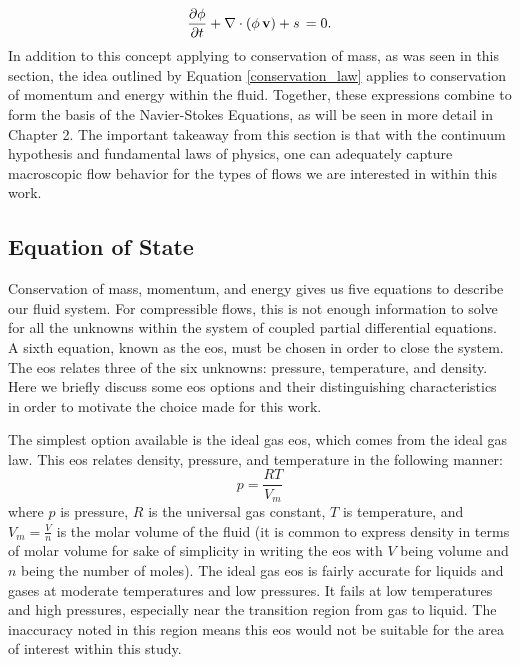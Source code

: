 \begin{equation} \label{conservation_law}
\dfrac{\partial \phi}{\partial t} +  \nabla \cdot \left(\phi \, \vb{v} \right) + s \,  = 0.
\end{equation}
In addition to this concept applying to conservation of mass, as was seen in this section, the idea outlined by Equation \eqref{conservation_law} applies to conservation of momentum and energy within the fluid. Together, these expressions combine to form the basis of the Navier-Stokes Equations, as will be seen in more detail in Chapter 2. The important takeaway from this section is that with the continuum hypothesis and fundamental laws of physics, one can adequately capture macroscopic flow behavior for the types of flows we are interested in within this work.  

\subsection{Equation of State}
Conservation of mass, momentum, and energy gives us five equations to describe our fluid system. For compressible flows, this is not enough information to solve for all the unknowns within the system of coupled partial differential equations. A sixth equation, known as the \gls{eos}, must be chosen in order to close the system. The \gls{eos} relates three of the six unknowns: pressure, temperature, and density. Here we briefly discuss some \gls{eos} options and their distinguishing characteristics in order to motivate the choice made for this work. 

The simplest option available is the ideal gas \gls{eos}, which comes from the ideal gas law. This \gls{eos} relates density, pressure, and temperature in the following manner: 
\begin{equation} \label{ideal_gas}
p = \dfrac{RT}{V_m}
\end{equation}
where $p$ is pressure, $R$ is the universal gas constant, $T$ is temperature, and $V_m = \tfrac{V}{n}$ is the molar volume of the fluid (it is common to express density in terms of molar volume for sake of simplicity in writing the \gls{eos} with $V$ being volume and $n$ being the number of moles). The ideal gas \gls{eos} is fairly accurate for liquids and gases at moderate temperatures and low pressures. It fails at low temperatures and high pressures, especially near the transition region from gas to liquid. The inaccuracy noted in this region means this \gls{eos} would not be suitable for the area of interest within this study. 

